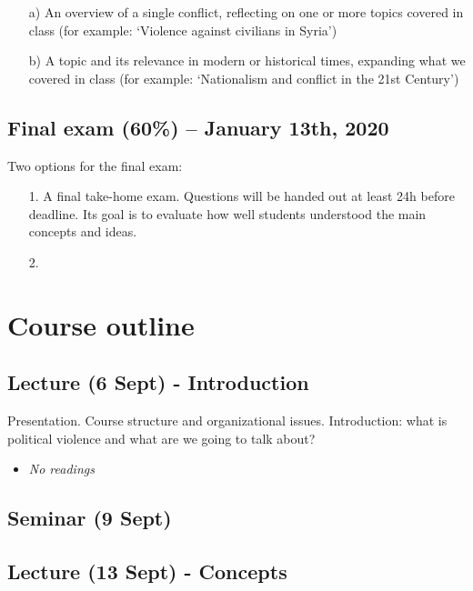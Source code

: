 \documentclass[12pt, a4paper]{article}
\begin{document}
\begin{itemize}
\setlength\itemsep{0pt}
\item[a)] An overview of a single conflict, reflecting on one or more topics covered in class (for example: `Violence against civilians in Syria')
\item[b)] A topic and its relevance in modern or historical times, expanding what we covered in class (for example: `Nationalism and conflict in the 21st Century')
\end{itemize}

\subsection*{Final exam (60\%) -- January 13th, 2020}

Two options for the final exam:

\begin{itemize}
  \item[1.] A final take-home exam. Questions will be handed out at least 24h before deadline. Its goal is to evaluate how well students understood the main concepts and ideas.
  \item[2.]
\end{itemize}

\newpage
\section{Course outline}

\subsection*{Lecture (6 Sept) - Introduction}

Presentation. Course structure and organizational issues. Introduction: what is political violence and what are we going to talk about?

\begin{itemize}
\setlength\itemsep{-5pt}
\item \textit{No readings}
\end{itemize}

\subsection*{Seminar (9 Sept) {\color{red}{(No class)}}}

\subsection*{Lecture (13 Sept) - Concepts}
\end{document}
